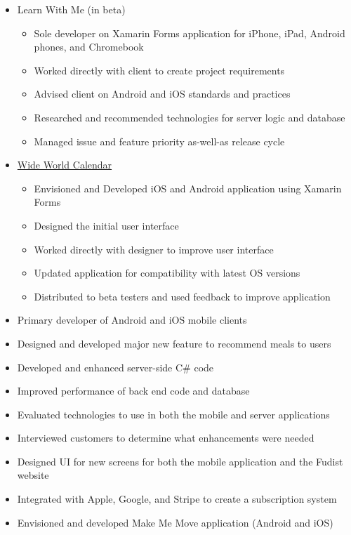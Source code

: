 \documentclass[12pt,letterpaper,sans]{moderncv}
\begin{document}
	\begin{itemize}[leftmargin=1.24in]
		\item Learn With Me (in beta)
			\begin{itemize}
				\item Sole developer on Xamarin Forms application for iPhone, iPad, Android phones, and Chromebook
				\item Worked directly with client to create project requirements
				\item Advised client on Android and iOS standards and practices
				\item Researched and recommended technologies for server logic and database
				\item Managed issue and feature priority as-well-as release cycle
			\end{itemize}
		\item \href{https://github.com/HofmaDresu/WideWorldCalendar}{Wide World Calendar}
			\begin{itemize}
				\item Envisioned and Developed iOS and Android application using Xamarin Forms
				\item Designed the initial user interface
				\item Worked directly with designer to improve user interface
				\item Updated application for compatibility with latest OS versions
				\item Distributed to beta testers and used feedback to improve application
			\end{itemize} 
	\end{itemize}
	\begin{itemize}[leftmargin=1.24in]
		\item Primary developer of Android and iOS mobile clients
		\item Designed and developed major new feature to recommend meals to users
		\item Developed and enhanced server-side C\# code
		\item Improved performance of back end code and database
		\item Evaluated technologies to use in both the mobile and server applications
		\item Interviewed customers to determine what enhancements were needed
		\item Designed UI for new screens for both the mobile application and the Fudist website
		\item Integrated with Apple, Google, and Stripe to create a subscription system	
		\item Envisioned and developed Make Me Move application (Android and iOS)
	\end{itemize}
\end{document}
